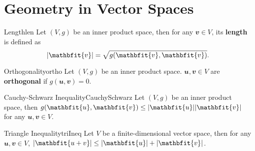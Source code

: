 \documentclass[math, code]{amznotes}
\theoremstyle{remark}
\begin{document}
\section{Geometry in Vector Spaces}
\begin{dfnbox}{Length}{len}
    Let $(V, g)$ be an inner product space, then for any $\mathbfit{v} \in V$, its {\color{red} \textbf{length}} is defined as 
    \begin{equation*}
        \abs{\mathbfit{v}} = \sqrt{g(\mathbfit{v}, \mathbfit{v})}.
    \end{equation*}
\end{dfnbox}
\begin{dfnbox}{Orthogonality}{ortho}
    Let $(V, g)$ be an inner product space. $\mathbfit{u}, \mathbfit{v} \in V$ are {\color{red} \textbf{orthogonal}} if $g(\mathbfit{u}, \mathbfit{v}) = 0$.
\end{dfnbox}
\begin{thmbox}{Cauchy-Schwarz Inequality}{CauchySchwarz}
    Let $(V, g)$ be an inner product space, then $g(\mathbfit{u}, \mathbfit{v}) \leq \abs{\mathbfit{u}}\abs{\mathbfit{v}}$ for any $\mathbfit{u}, \mathbfit{v} \in V$.
\end{thmbox}
\begin{corbox}{Triangle Inequality}{triIneq}
    Let $V$ be a finite-dimensional vector space, then for any $\mathbfit{u}, \mathbfit{v} \in V$, $\abs{\mathbfit{u + v}} \leq \abs{\mathbfit{u}} + \abs{\mathbfit{v}}$. 
\end{corbox}
\end{document}
